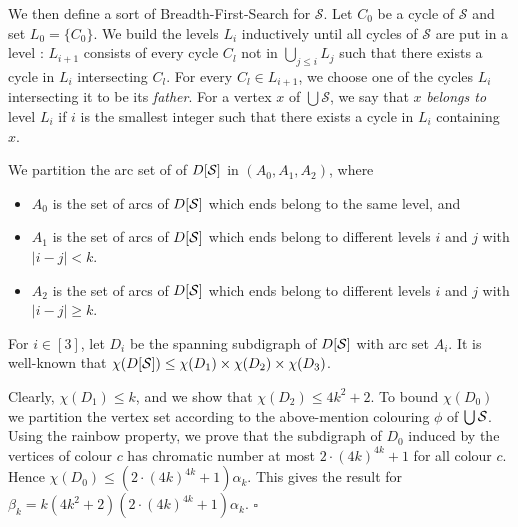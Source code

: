 \documentclass{endm}
\begin{document}
We then define a sort of Breadth-First-Search for $\mathcal{S}$.
Let $C_0$ be a cycle of $\mathcal{S}$ and set $L_0 = \{C_0\}$. We build  the levels $L_i$ inductively
until all cycles of $\mathcal{S}$ are put in a level : $L_{i+1}$ consists of every cycle $C_l$ not in $\bigcup_{j \leq i} L_j$ such that 
there exists a cycle in $L_i$ intersecting $C_l$.  For every $C_l\in L_{i+1}$, we choose one of the cycles $L_{i}$ intersecting it to be its {\it  father}. 
For a vertex $x$ of $\bigcup \mathcal{S}$, we say that $x$ \textit{belongs to} level $L_i$ if
$i$ is the smallest integer such that there exists a cycle in $L_i$ containing $x$. 

We partition the arc set of of $D[{\cal S}]$  in $(A_0,A_1, A_2)$, where
\begin{itemize}
	\item $A_0$ is the set of arcs of $D[{\cal S}]$ which ends belong to the same level, and
	\item $A_1$ is the set of arcs of $D[{\cal S}]$ which ends belong to different levels $i$ and $j$ with $ | i - j| < k$.	
	\item $A_2$ is the set of arcs of $D[{\cal S}]$ which ends belong to different levels $i$ and $j$ with $ | i - j| \geq k$.
\end{itemize} 

For $i\in [3]$, let $D_i$ be the spanning subdigraph of $D[{\cal S}]$ with arc set $A_i$. It is well-known that $\chi(D[{\cal S}])\leq \chi(D_1)\times \chi(D_2) \times \chi(D_3)$.

Clearly, $\chi(D_1)\leq k$, and we show that $\chi(D_2)\leq 4k^2 +2$. To bound $\chi(D_0)$ we partition the vertex set according to the above-mention colouring $\phi$ of $\bigcup {\cal S}$.
Using the rainbow property, we prove that the subdigraph of $D_0$ induced by the vertices of colour $c$ has chromatic number at most $2\cdot (4k)^{4k} + 1$ for all colour $c$. Hence $\chi(D_0) \leq (2\cdot (4k)^{4k} + 1) \alpha_k$.
This gives the result for $\beta_k= k (4k^2+2) (2\cdot (4k)^{4k} + 1) \alpha_k$.
\hfill $\square$
\end{document}
